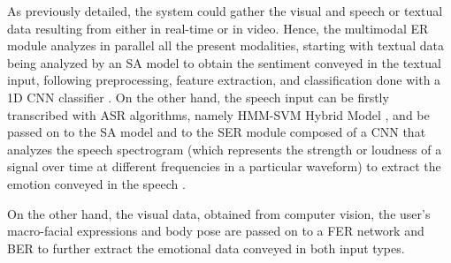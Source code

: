 \documentclass[runningheads]{llncs}
\begin{document}

As previously detailed, the system could gather the visual and speech or textual data resulting from either in real-time or in video. Hence, the multimodal ER module analyzes in parallel all the present modalities, starting with textual data being analyzed by an SA model to obtain the sentiment conveyed in the textual input, following preprocessing, feature extraction, and classification done with a 1D CNN classifier \cite{hung_beyond_2023}. On the other hand, the speech input can be firstly transcribed with ASR algorithms, namely HMM-SVM Hybrid Model \cite{malik_automatic_2021}, and be passed on to the SA model and to the SER module composed of a CNN that analyzes the speech spectrogram (which represents the strength or loudness of a signal over time at different frequencies in a particular waveform) to extract the emotion conveyed in the speech \cite{Badshah2017}.

On the other hand, the visual data, obtained from computer vision, the user's macro-facial expressions and body pose are passed on to a FER network and BER to further extract the emotional data conveyed in both input types.
\end{document}
